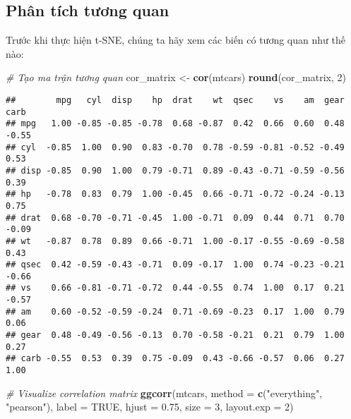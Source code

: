 \documentclass[
]{article}
\newenvironment{Shaded}{\begin{snugshade}}{\end{snugshade}}
\newcommand{\AttributeTok}[1]{\textcolor[rgb]{0.13,0.29,0.53}{#1}}
\newcommand{\CommentTok}[1]{\textcolor[rgb]{0.56,0.35,0.01}{\textit{#1}}}
\newcommand{\ConstantTok}[1]{\textcolor[rgb]{0.56,0.35,0.01}{#1}}
\newcommand{\DecValTok}[1]{\textcolor[rgb]{0.00,0.00,0.81}{#1}}
\newcommand{\FloatTok}[1]{\textcolor[rgb]{0.00,0.00,0.81}{#1}}
\newcommand{\FunctionTok}[1]{\textcolor[rgb]{0.13,0.29,0.53}{\textbf{#1}}}
\newcommand{\NormalTok}[1]{#1}
\newcommand{\OtherTok}[1]{\textcolor[rgb]{0.56,0.35,0.01}{#1}}
\newcommand{\StringTok}[1]{\textcolor[rgb]{0.31,0.60,0.02}{#1}}
\begin{document}
\subsection{Phân tích tương
quan}\label{phuxe2n-tuxedch-tux1b0ux1a1ng-quan}

Trước khi thực hiện t-SNE, chúng ta hãy xem các biến có tương quan như
thế nào:

\begin{Shaded}
\begin{Highlighting}[]
\CommentTok{\# Tạo ma trận tương quan}
\NormalTok{cor\_matrix }\OtherTok{\textless{}{-}} \FunctionTok{cor}\NormalTok{(mtcars)}
\FunctionTok{round}\NormalTok{(cor\_matrix, }\DecValTok{2}\NormalTok{)}
\end{Highlighting}
\end{Shaded}

\begin{verbatim}
##        mpg   cyl  disp    hp  drat    wt  qsec    vs    am  gear  carb
## mpg   1.00 -0.85 -0.85 -0.78  0.68 -0.87  0.42  0.66  0.60  0.48 -0.55
## cyl  -0.85  1.00  0.90  0.83 -0.70  0.78 -0.59 -0.81 -0.52 -0.49  0.53
## disp -0.85  0.90  1.00  0.79 -0.71  0.89 -0.43 -0.71 -0.59 -0.56  0.39
## hp   -0.78  0.83  0.79  1.00 -0.45  0.66 -0.71 -0.72 -0.24 -0.13  0.75
## drat  0.68 -0.70 -0.71 -0.45  1.00 -0.71  0.09  0.44  0.71  0.70 -0.09
## wt   -0.87  0.78  0.89  0.66 -0.71  1.00 -0.17 -0.55 -0.69 -0.58  0.43
## qsec  0.42 -0.59 -0.43 -0.71  0.09 -0.17  1.00  0.74 -0.23 -0.21 -0.66
## vs    0.66 -0.81 -0.71 -0.72  0.44 -0.55  0.74  1.00  0.17  0.21 -0.57
## am    0.60 -0.52 -0.59 -0.24  0.71 -0.69 -0.23  0.17  1.00  0.79  0.06
## gear  0.48 -0.49 -0.56 -0.13  0.70 -0.58 -0.21  0.21  0.79  1.00  0.27
## carb -0.55  0.53  0.39  0.75 -0.09  0.43 -0.66 -0.57  0.06  0.27  1.00
\end{verbatim}

\begin{Shaded}
\begin{Highlighting}[]
\CommentTok{\# Visualize correlation matrix}
\FunctionTok{ggcorr}\NormalTok{(mtcars, }
       \AttributeTok{method =} \FunctionTok{c}\NormalTok{(}\StringTok{"everything"}\NormalTok{, }\StringTok{"pearson"}\NormalTok{), }
       \AttributeTok{label =} \ConstantTok{TRUE}\NormalTok{, }
       \AttributeTok{hjust =} \FloatTok{0.75}\NormalTok{, }
       \AttributeTok{size =} \DecValTok{3}\NormalTok{, }
       \AttributeTok{layout.exp =} \DecValTok{2}\NormalTok{)}
\end{Highlighting}
\end{Shaded}
\end{document}
